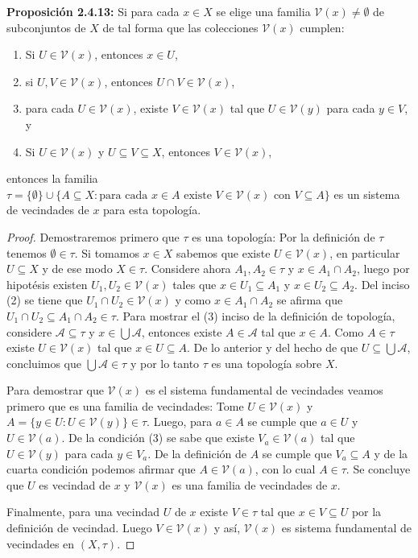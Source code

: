 \textbf{Proposición 2.4.13:} Si para cada $x\in X$ se elige una familia $\mathcal{V}(x)\neq\emptyset$  de subconjuntos de $X$ de tal forma que las colecciones $\mathcal{V}(x)$ cumplen:
\begin{enumerate}
    \item Si $U\in\mathcal{V}(x)$, entonces $x\in U$,
    \item si $U,V\in\mathcal{V}(x)$, entonces $U\cap V\in\mathcal{V}(x)$,
    \item para cada $U\in\mathcal{V}(x)$, existe $V\in\mathcal{V}(x)$ tal que $U\in\mathcal{V}(y)$ para cada $y\in V$, y 
    \item Si $U\in\mathcal{V}(x)$ y $U\subseteq V\subseteq X$, entonces $V\in\mathcal{V}(x)$,
\end{enumerate}
entonces la familia $\tau=\{\emptyset\}\cup\{A\subseteq X:\text{para cada }x\in A\text{ existe }V\in\mathcal{V}(x)\text{ con }V\subseteq A\}$ es un sistema de vecindades de $x$ para esta topología.

\begin{proof}
Demostraremos primero que $\tau$ es una topología: Por la definición de $\tau$ tenemos $\emptyset\in\tau$. Si tomamos $x\in X$ sabemos que existe $U\in\mathcal{V}(x)$, en particular $U\subseteq X$ y de ese modo $X\in\tau$. Considere ahora $A_1,A_2\in\tau$ y $x\in A_1\cap A_2$, luego por hipotésis existen $U_1,U_2\in\mathcal{V}(x)$ tales que $x\in U_1\subseteq A_1$ y $x\in U_2\subseteq A_2$. Del inciso (2) se tiene que $U_1\cap U_2\in\mathcal{V}(x)$ y como $x\in A_1\cap A_2$ se afirma que $U_1\cap U_2\subseteq A_1\cap A_2\in\tau$. Para mostrar el (3) inciso de la definición de topología, considere $\mathcal{A}\subseteq\tau$ y $x\in\bigcup\mathcal{A}$, entonces existe $A\in\mathcal{A}$ tal que $x\in A$. Como $A\in\tau$ existe $U\in\mathcal{V}(x)$ tal que $x\in U\subseteq A$. De lo anterior y del hecho de que $U\subseteq\bigcup\mathcal{A}$, concluimos que $\bigcup\mathcal{A}\in\tau$ y por lo tanto $\tau$ es una topología sobre $X$.

Para demostrar que $\mathcal{V}(x)$ es el sistema fundamental de vecindades veamos primero que es una familia de vecindades: Tome $U\in\mathcal{V}(x)$ y $A=\{y\in U:U\in\mathcal{V}(y)\}\in\tau$. Luego, para $a\in A$ se cumple que $a\in U$ y $U\in\mathcal{V}(a)$. De la condición (3) se sabe que existe $V_a\in\mathcal{V}(a)$ tal que $U\in\mathcal{V}(y)$ para cada $y\in V_a$. De la definición de $A$ se cumple que $V_a\subseteq A$ y de la cuarta condición podemos afirmar que $A\in\mathcal{V}(a)$, con lo cual $A\in\tau$. Se concluye que $U$ es vecindad de $x$ y $\mathcal{V}(x)$ es una familia de vecindades de $x$.

Finalmente, para una vecindad $U$ de $x$ existe $V\in\tau$ tal que $x\in V\subseteq U$ por la definición de vecindad. Luego $V\in\mathcal{V}(x)$ y así, $\mathcal{V}(x)$ es sistema fundamental de vecindades en $(X,\tau)$.
\end{proof}


